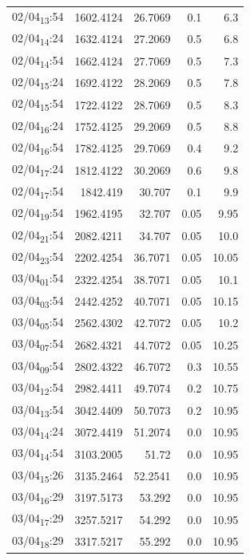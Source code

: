 \documentclass[11pt]{article}
\begin{document}
\begin{center}
\begin{tabular}{lrrrr}
02/04\textsubscript{13}:54 & 1602.4124 & 26.7069 & 0.1 & 6.3\\[0pt]
02/04\textsubscript{14}:24 & 1632.4124 & 27.2069 & 0.5 & 6.8\\[0pt]
02/04\textsubscript{14}:54 & 1662.4124 & 27.7069 & 0.5 & 7.3\\[0pt]
02/04\textsubscript{15}:24 & 1692.4122 & 28.2069 & 0.5 & 7.8\\[0pt]
02/04\textsubscript{15}:54 & 1722.4122 & 28.7069 & 0.5 & 8.3\\[0pt]
02/04\textsubscript{16}:24 & 1752.4125 & 29.2069 & 0.5 & 8.8\\[0pt]
02/04\textsubscript{16}:54 & 1782.4125 & 29.7069 & 0.4 & 9.2\\[0pt]
02/04\textsubscript{17}:24 & 1812.4122 & 30.2069 & 0.6 & 9.8\\[0pt]
02/04\textsubscript{17}:54 & 1842.419 & 30.707 & 0.1 & 9.9\\[0pt]
02/04\textsubscript{19}:54 & 1962.4195 & 32.707 & 0.05 & 9.95\\[0pt]
02/04\textsubscript{21}:54 & 2082.4211 & 34.707 & 0.05 & 10.0\\[0pt]
02/04\textsubscript{23}:54 & 2202.4254 & 36.7071 & 0.05 & 10.05\\[0pt]
03/04\textsubscript{01}:54 & 2322.4254 & 38.7071 & 0.05 & 10.1\\[0pt]
03/04\textsubscript{03}:54 & 2442.4252 & 40.7071 & 0.05 & 10.15\\[0pt]
03/04\textsubscript{05}:54 & 2562.4302 & 42.7072 & 0.05 & 10.2\\[0pt]
03/04\textsubscript{07}:54 & 2682.4321 & 44.7072 & 0.05 & 10.25\\[0pt]
03/04\textsubscript{09}:54 & 2802.4322 & 46.7072 & 0.3 & 10.55\\[0pt]
03/04\textsubscript{12}:54 & 2982.4411 & 49.7074 & 0.2 & 10.75\\[0pt]
03/04\textsubscript{13}:54 & 3042.4409 & 50.7073 & 0.2 & 10.95\\[0pt]
03/04\textsubscript{14}:24 & 3072.4419 & 51.2074 & 0.0 & 10.95\\[0pt]
03/04\textsubscript{14}:54 & 3103.2005 & 51.72 & 0.0 & 10.95\\[0pt]
03/04\textsubscript{15}:26 & 3135.2464 & 52.2541 & 0.0 & 10.95\\[0pt]
03/04\textsubscript{16}:29 & 3197.5173 & 53.292 & 0.0 & 10.95\\[0pt]
03/04\textsubscript{17}:29 & 3257.5217 & 54.292 & 0.0 & 10.95\\[0pt]
03/04\textsubscript{18}:29 & 3317.5217 & 55.292 & 0.0 & 10.95\\[0pt]
\end{tabular}
\end{center}
\end{document}
